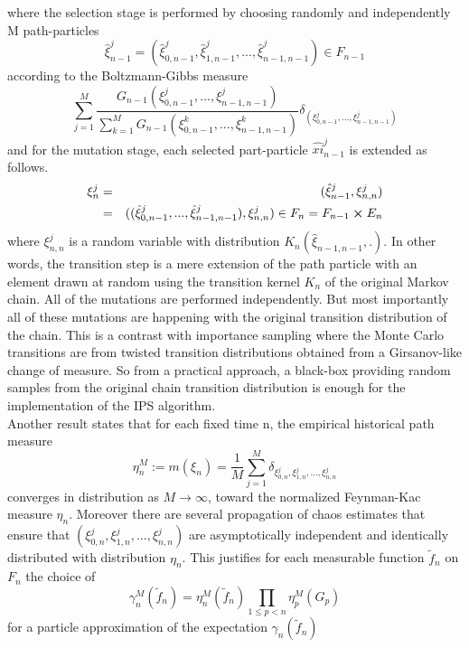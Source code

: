 where the selection stage is performed by choosing randomly and independently M path-particles
$$\hat{\xi}_{n-1}^j = (\hat{\xi}_{0,n-1}^j, \hat{\xi}_{1,n-1}^j,...,\hat{\xi}_{n-1,n-1}^j) \in F_{n-1}$$
according to the Boltzmann-Gibbs measure
\begin{equation}
\sum_{j=1}^{M} \frac{G_{n-1}(\xi_{0,n-1}^j,...,\xi_{n-1,n-1}^j)}{\sum_{k=1}^{M}G_{n-1}(\xi_{0,n-1}^k,...,\xi_{n-1,n-1}^k)} \delta_{(\xi_{0,n-1}^j,...,\xi_{n-1,n-1}^j)}
\end{equation}
and for the mutation stage, each selected part-particle $\hat{xi}_{n-1}^j$ is extended as follows.
\begin{eqnarray*}
\xi_n^j & = & (\hat{\xi}_{n-1}^j, \xi_{n,n}^j)\\
& = & ((\hat{\xi}_{0,n-1}^j,..., \hat{\xi}_{n-1,n-1}^j), \xi_{n,n}^j) \in F_n = F_{n-1} \cross E_n
\end{eqnarray*}
where $\xi_{n,n}^j$ is a random variable with distribution $K_n(\hat{\xi}_{n-1,n-1},.)$. In other words, the transition step is a mere extension of the path particle with an element drawn at random using the transition kernel $K_n$ of the original Markov chain. All of the mutations are performed independently. But most importantly all of these mutations are happening with the original transition distribution of the chain. This is a contrast with importance sampling where the Monte Carlo transitions are from twisted transition distributions obtained from a Girsanov-like change of measure. So from a practical approach, a black-box providing random samples from the original chain transition distribution is enough for the implementation of the IPS algorithm.\\

Another result states that for each fixed time n, the empirical historical path measure
$$\eta_n^M := m(\xi_n) = \frac{1}{M} \sum_{j=1}^{M} \delta_{\xi_{0,n}^j,\xi_{1,n}^j,...,\xi_{n,n}^j}$$ converges in distribution as $M \rightarrow \infty$, toward the normalized Feynman-Kac measure $\eta_n$. Moreover there are several propagation of chaos estimates that ensure that $(\xi_{0,n}^j, \xi_{1,n}^j,...,\xi_{n,n}^j)$ are asymptotically independent and identically distributed with distribution $\eta_n$. This justifies for each measurable function $\tilde{f}_n$ on $F_n$ the choice of
\begin{equation}
\gamma_n^M(\tilde{f}_n) = \eta_n^M(\tilde{f}_n) \prod_{1\leq p <n}\eta_p^M(G_p)
\end{equation}
for a particle approximation of the expectation $\gamma_n(\tilde{f}_n)$

